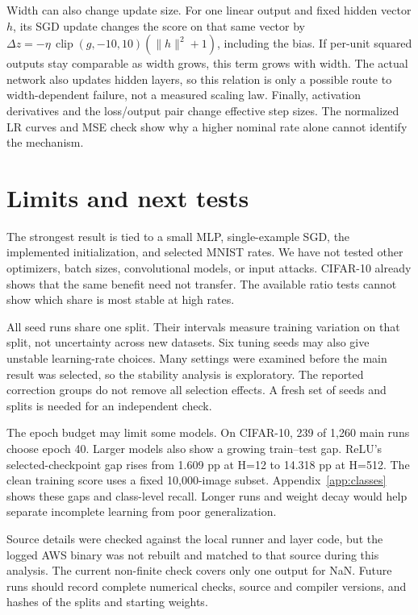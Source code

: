 \documentclass[10pt]{article}
\begin{document}
Width can also change update size. For one linear output and fixed hidden vector $h$, its SGD update changes the score on that same vector by $\Delta z=-\eta\,\operatorname{clip}(g,-10,10)(\|h\|^2+1)$, including the bias. If per-unit squared outputs stay comparable as width grows, this term grows with width. The actual network also updates hidden layers, so this relation is only a possible route to width-dependent failure, not a measured scaling law. Finally, activation derivatives and the loss/output pair change effective step sizes. The normalized LR curves and MSE check show why a higher nominal rate alone cannot identify the mechanism.

\section{Limits and next tests}
The strongest result is tied to a small MLP, single-example SGD, the implemented initialization, and selected MNIST rates. We have not tested other optimizers, batch sizes, convolutional models, or input attacks. CIFAR-10 already shows that the same benefit need not transfer. The available ratio tests cannot show which share is most stable at high rates.

All seed runs share one split. Their intervals measure training variation on that split, not uncertainty across new datasets. Six tuning seeds may also give unstable learning-rate choices. Many settings were examined before the main result was selected, so the stability analysis is exploratory. The reported correction groups do not remove all selection effects. A fresh set of seeds and splits is needed for an independent check.

The epoch budget may limit some models. On CIFAR-10, 239 of 1,260 main runs choose epoch 40. Larger models also show a growing train--test gap. ReLU's selected-checkpoint gap rises from 1.609 pp at H=12 to 14.318 pp at H=512. The clean training score uses a fixed 10,000-image subset. Appendix~\ref{app:classes} shows these gaps and class-level recall. Longer runs and weight decay would help separate incomplete learning from poor generalization.

Source details were checked against the local runner and layer code, but the logged AWS binary was not rebuilt and matched to that source during this analysis. The current non-finite check covers only one output for NaN. Future runs should record complete numerical checks, source and compiler versions, and hashes of the splits and starting weights.
\end{document}
